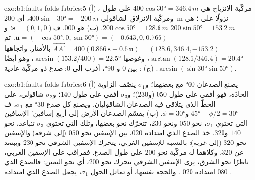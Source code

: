 \begin{solution}{exo:b1:faults-folds-fabrics:5}
(أ) مركّبة الانزياح هي $400\cos\ang{30} = \qty{346.4}{m}$ على طول ، ومركّبة الانزلاق الشاقولي $400\sin\ang{-30} = \qty{-200}{m}$، أي \qty{200}{m} نزولًا على ؛  هي $200\sin\ang{50} = \qty{153.2}{m}$  $200\cos\ang{50} = \qty{128.6}{m}$. (ب)  هو $000$، ف$\mathbf s = (0, 1, 0)$؛ و$\mathbf u = (-\cos\ang{50}, 0, \sin\ang{50}) =
(-0.643, 0, 0.766)$. ثم
$\overrightarrow{AA'} = 400(0.866\,\mathbf s - 0.5\,\mathbf u) =
(128.6, 346.4, -153.2)$ بالأمتار. واتجاهها $\arctan(128.6/346.4) =
\ang{20.4}$، وغوصها $\arcsin(153.2/400) = \ang{22.5}$، وهو أيضًا
$\arcsin(\sin\ang{30}\sin\ang{50})$. (ج) :  بين $0$ و\ang{-90}، أقرب إلى $0$: صدع  ذو مركّبة عادية.
\end{solution}

\begin{solution}{exo:b1:faults-folds-fabrics:6}
(أ) يصنع الصدعان \ang{60} مع بعضهما؛ و$\sigma_1$ ينصّف الزاوية الحادّة، فهو أفقي على طول $050$ (و$230$)؛ و$\sigma_3$ أفقي على طول $140$؛ و$\sigma_2$ شاقولي، على الخطّ الذي يتلاقى فيه الصدعان الشاقوليان. ويصنع كل صدع \ang{30} مع $\sigma_1$، ف$\ang{45} - \phi/2 =
\ang{30}$ و$\phi = \ang{30}$. (ب) يقسّم الصدعان الأرض إلى أربع إسافين؛ الإسافين التي تحتوي $\sigma_1$، نحو $050$ ونحو $230$، تتحرّك نحو بعضها، وتلك التي تحتوي $\sigma_3$ تتباعد، نحو $140$ و$320$. خذ الصدع الذي امتداده $020$، بين الإسفين نحو $050$ (إلى شرقه) والإسفين نحو $320$ (إلى غربه): بالنسبة للإسفين الغربي، يتحرك الإسفين الشرقي نحو $230$ ويبتعد عن $320$، وكلاهما له مركّبة نحو $200$ على طول الصدع. فمراقب على الإسفين الغربي، ناظرًا نحو الشرق، يرى الإسفين الشرقي يتحرك نحو $200$، أي نحو اليمين: فالصدع الذي امتداده $020$ . والحجة نفسها، أو تماثل الحول $\sigma_1$، يجعل الصدع الذي امتداده $080$ .
\end{solution}

